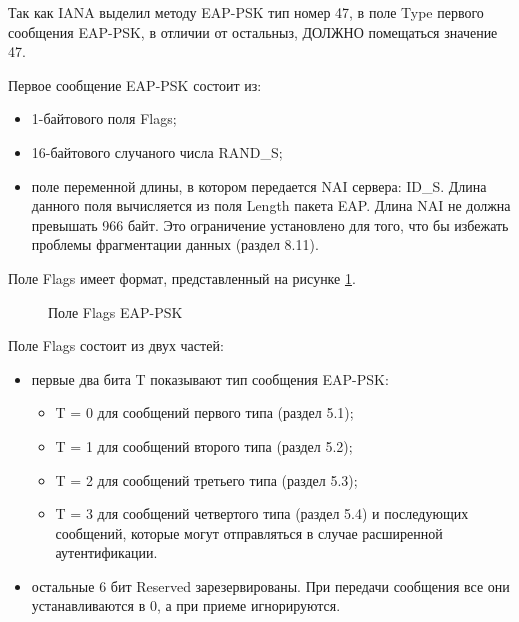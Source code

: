Так как IANA выделил методу EAP-PSK тип номер 47, в поле Type первого сообщения EAP-PSK, в отличии от остальныз, ДОЛЖНО помещаться значение 47.

Первое сообщение EAP-PSK состоит из:

\begin{itemize}
\item 1-байтового поля Flags;
\item 16-байтового случаного числа RAND\_S;
\item поле переменной длины, в котором передается NAI сервера: ID\_S. Длина данного поля вычисляется из поля Length пакета EAP. Длина NAI не должна превышать 966 байт. Это ограничение установлено для того, что бы избежать проблемы фрагментации данных (раздел 8.11).
\end{itemize}

Поле Flags имеет формат, представленный на рисунке \ref{img:flags_field}.

\begin{figure}[h!]
\caption{Поле Flags EAP-PSK}
\label{img:flags_field}
\end{figure}

Поле Flags состоит из двух частей:

\begin{itemize}
\item первые два бита T показывают тип сообщения EAP-PSK:
\begin{itemize}
\item T = 0 для сообщений первого типа (раздел 5.1);
\item T = 1 для сообщений второго типа (раздел 5.2);
\item T = 2 для сообщений третьего типа (раздел 5.3);
\item T = 3 для сообщений четвертого типа (раздел 5.4) и последующих сообщений, которые могут отправляться в случае расширенной аутентификации.
\end{itemize}
\item остальные 6 бит Reserved зарезервированы. При передачи сообщения все они устанавливаются в 0, а при приеме игнорируются.
\end{itemize}

